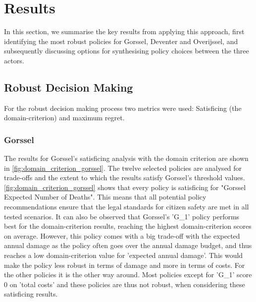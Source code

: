 \section{Results}
\label{s:results}

In this section, we summarise the key results from applying this approach, first identifying the most robust policies for Gorssel, Deventer and Overijssel, and subsequently discussing options for synthesising policy choices between the three actors. 

\subsection{Robust Decision Making}
For the robust decision making process two metrics were used: Satisficing (the domain-criterion) and maximum regret. 
\subsubsection{Gorssel}
The results for Gorssel's satisficing analysis with the domain criterion are shown in \autoref{fig:domain_criterion_gorssel}. The twelve selected policies are analysed for trade-offs and the extent to which the results satisfy Gorssel's threshold values. \newline
\autoref{fig:domain_criterion_gorssel} shows that every policy is satisficing for "Gorssel Expected Number of Deaths". This means that all potential policy recommendations ensure that the legal standards for citizen safety are met in all tested scenarios. 
It can also be observed that Gorssel's 'G\_1' policy performs best for the domain-criterion results, reaching the highest domain-criterion scores on average. However, this policy comes with a big trade-off with the expected annual damage as the policy often goes over the annual damage budget, and thus reaches a low domain-criterion value for 'expected annual damage'. This would make the policy less robust in terms of damage and more in terms of costs. For the other policies it is the other way around. Most policies except for 'G\_1' score 0 on 'total costs' and these policies are thus not robust, when considering these satisficing results.  \newline


